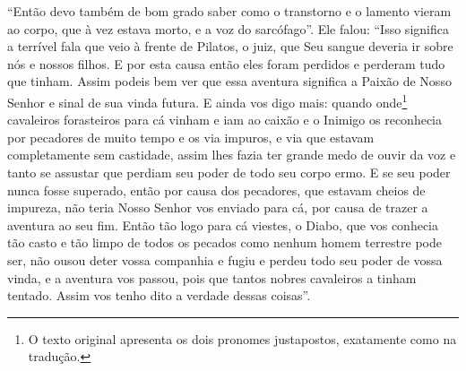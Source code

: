 “Então devo também de bom grado saber como o transtorno e o lamento vieram ao
corpo, que à vez estava morto, e a voz do sarcófago”. Ele falou: “Isso
significa a terrível fala que veio à frente de Pilatos, o juiz, que Seu sangue
deveria ir sobre nós e nossos filhos. E por esta causa então eles foram
perdidos e perderam tudo que tinham. Assim podeis bem ver que essa aventura
significa a Paixão de Nosso Senhor e sinal de sua vinda futura. E ainda vos
digo mais: quando onde\footnote{ O texto original apresenta os dois pronomes
justapostos, exatamente como na tradução.}  cavaleiros forasteiros
para cá vinham e iam ao caixão e o Inimigo os reconhecia por pecadores de muito
tempo e os via impuros, e via que estavam completamente sem castidade, assim
lhes fazia ter grande medo de ouvir da voz e tanto se assustar que perdiam seu
poder de todo seu corpo ermo. E se seu poder nunca fosse superado, então por
causa dos pecadores, que estavam cheios de impureza, não teria Nosso Senhor vos
enviado para cá, por causa de trazer a aventura ao seu fim. Então tão logo para
cá viestes, o Diabo, que vos conhecia tão casto e tão limpo de todos os pecados
como nenhum homem terrestre pode ser, não ousou deter vossa companhia e fugiu e
perdeu todo seu poder de vossa vinda, e a aventura vos passou, pois que tantos
nobres cavaleiros a tinham tentado. Assim vos tenho dito a verdade dessas
coisas”. 

